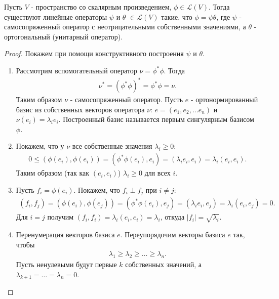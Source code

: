 \begin{theorem}
    Пусть $V$ - пространство со скалярным произведением, $\phi \in \mathcal{L}(V)$. Тогда существуют линейные операторы $\psi$ и $\theta$ $\in \mathcal{L}(V)$ такие, что $\phi = \psi \theta$, где $\psi$ - самосопряженный оператор с неотрицательными собственными значениями, а 
    $\theta$ - ортогональный (унитарный оператор).
\end{theorem}

\begin{proof}
    Покажем при помощи конструктивного построения $\psi$ и $\theta$.
    \begin{enumerate}
        \item Рассмотрим вспомогательный оператор $\nu = \phi^* \phi$.
        Тогда \begin{gather*}
            \nu^* = (\phi^* \phi)^* = \phi^* \phi = \nu.
        \end{gather*}
        Таким образом $\nu$ - самосопряженный оператор. Пусть $e$ - ортонормированный базис из собственных векторов оператора $\nu$: $e = (e_1, e_2, \dots e_n)$ и $\nu(e_i) = \lambda_i e_i$.
        Построенный базис называется первым сингулярным базисом $\phi$.
        \item Покажем, что у $\nu$ все собственные значения $\lambda_i \geq 0$:
        \begin{gather*}
            0 \leq (\phi(e_i), \phi(e_i)) = (\phi^* \phi(e_i), e_i) = (\lambda_i e_i, e_i) = \lambda_i (e_i, e_i).
        \end{gather*}
        Таким образом (так как $(e_i, e_i)$) $\lambda_i \geq 0$ для всех $i$.
        \item Пусть $f_i = \phi(e_i)$. Покажем, что $f_i \perp f_j$ при $i \neq j$: \begin{gather*}
            (f_i, f_j) = (\phi(e_i), \phi(e_j)) = (\phi^* \phi(e_i), e_j) = (\lambda_i e_i, e_j) =
            \lambda_i(e_i, e_j) = 0.
        \end{gather*}
        Для $i = j$ получим $(f_i, f_i) = \lambda_i (e_i, e_i) = \lambda_i$, откуда $|f_i| = \sqrt{\lambda_i}$.
        \item Перенумерация векторов базиса $e$. Переупорядочим векторы базиса $e$ так, чтобы
        \begin{gather*}
            \lambda_1 \geq \lambda_2 \geq \dots \geq \lambda_n.
        \end{gather*}
        Пусть ненулевыми будут первые $k$ собственных значений, а $\lambda_{k+1} = \dots = \lambda_n = 0$.

\end{enumerate}
\end{proof}
